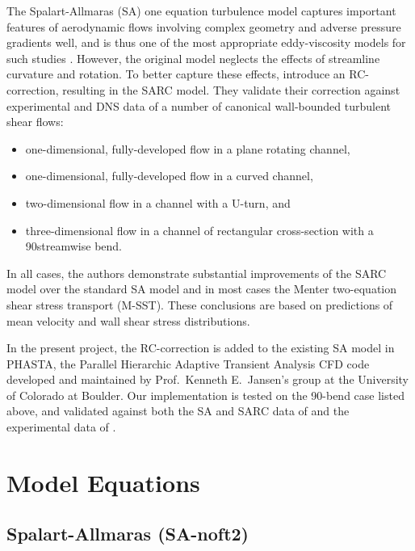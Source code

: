 \documentclass[11pt]{article}
\begin{document}
The Spalart-Allmaras (SA) one equation turbulence model captures important features of aerodynamic flows involving complex geometry and adverse pressure gradients well, and is thus one of the most appropriate eddy-viscosity models for such studies \citep{spalart1992}. However, the original model neglects the effects of streamline curvature and rotation. To better capture these effects, \citet{shur2000} introduce an RC-correction, resulting in the SARC model. They validate their correction against experimental and DNS data of a number of canonical wall-bounded turbulent shear flows: 
\begin{itemize}
\item one-dimensional, fully-developed flow in a plane rotating channel,
\item one-dimensional, fully-developed flow in a curved channel,
\item two-dimensional flow in a channel with a U-turn, and
\item three-dimensional flow in a channel of rectangular cross-section with a 90\degree streamwise bend.
\end{itemize}
In all cases, the authors demonstrate substantial improvements of the SARC model over the standard SA model and in most cases the Menter two-equation shear stress transport (M-SST). These conclusions are based on predictions of mean velocity and wall shear stress distributions.

In the present project, the \citet{shur2000} RC-correction is added to the existing SA model in PHASTA, the Parallel Hierarchic Adaptive Transient Analysis CFD code developed and maintained by Prof.\ Kenneth E.\ Jansen's group at the University of Colorado at Boulder. Our implementation is tested on the 90\degree-bend case listed above, and validated against both the SA and SARC data of \citet{shur2000} and the experimental data of \citet{kim1994}.



\section{Model Equations} %

\subsection{Spalart-Allmaras (SA-noft2)}
\end{document}
